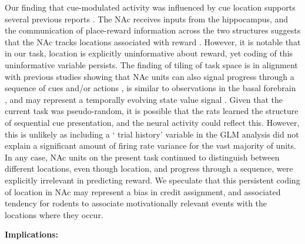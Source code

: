 \documentclass[11pt]{article}
\let\cite=\citep
\providecommand{\DIFadd}[1]{{\protect\color{red} \sf #1}} %
\providecommand{\DIFdel}[1]{} %
\providecommand{\DIFaddbegin}{} %
\providecommand{\DIFaddend}{} %
\providecommand{\DIFdelbegin}{} %
\providecommand{\DIFdelend}{} %
\newcommand{\DIFscaledelfig}{0.5}
\newlength{\DIFdelgraphicswidth} %
\newlength{\DIFdelgraphicsheight} %
\newcommand{\DIFaddincludegraphics}[2][]{{\color{red}\fbox{\DIFOincludegraphics[#1]{#2}}}} %
\newcommand{\DIFdelincludegraphics}[2][]{%
\sbox{\DIFdelgraphicsbox}{\DIFOincludegraphics[#1]{#2}}%
\settoboxwidth{\DIFdelgraphicswidth}{\DIFdelgraphicsbox} %
\settoboxtotalheight{\DIFdelgraphicsheight}{\DIFdelgraphicsbox} %
\scalebox{\DIFscaledelfig}{%
\parbox[b]{\DIFdelgraphicswidth}{\usebox{\DIFdelgraphicsbox}\\[-\baselineskip] \rule{\DIFdelgraphicswidth}{0em}}\llap{\resizebox{\DIFdelgraphicswidth}{\DIFdelgraphicsheight}{%
\setlength{\unitlength}{\DIFdelgraphicswidth}%
\begin{picture}(1,1)%
\thicklines\linethickness{2pt} %
{\color[rgb]{1,0,0}\put(0,0){\framebox(1,1){}}}%
{\color[rgb]{1,0,0}\put(0,0){\line( 1,1){1}}}%
{\color[rgb]{1,0,0}\put(0,1){\line(1,-1){1}}}%
\end{picture}%
}\hspace*{3pt}}} %
} %
\DeclareRobustCommand{\DIFaddbegin}{\DIFOaddbegin \let\includegraphics\DIFaddincludegraphics} %
\DeclareRobustCommand{\DIFaddend}{\DIFOaddend \let\includegraphics\DIFOincludegraphics} %
\DeclareRobustCommand{\DIFdelbegin}{\DIFOdelbegin \let\includegraphics\DIFdelincludegraphics} %
\DeclareRobustCommand{\DIFdelend}{\DIFOaddend \let\includegraphics\DIFOincludegraphics} %
\begin{document}
Our finding that \DIFdelbegin \DIFdel{cue-evoked activity was modulated }\DIFdelend \DIFaddbegin \DIFadd{cue-modulated activity was influenced }\DIFaddend by cue location \DIFdelbegin \DIFdel{is
in alignment with }\DIFdelend \DIFaddbegin \DIFadd{supports }\DIFaddend several previous reports \cite{Lavoie1994,Wiener2003,Mulder2005,Strait2016}. The NAc receives inputs from the hippocampus, and the communication of place-reward information across the two structures suggests that the NAc tracks locations associated with reward \cite{Tabuchi2000,Pennartz2004,Lansink2008,Lansink2009,VanderMeer2011,Lansink2016,Sjulson2017}. \DIFaddbegin \DIFadd{However, it is notable that in our task, location is explicitly uninformative about reward, yet coding of this uninformative variable persists. The finding of tiling of task space is in alignment with previous studies showing that }\DIFaddend NAc units can also signal progress through a sequence of cues and/or actions \cite{Shidara1998,Mulder2004,Khamassi2008,Berke2009,Lansink2012,Atallah2014}\DIFaddbegin \DIFadd{, is similar to observations in the basal forebrain \cite{Tingley2018}, and may represent a temporally evolving state value signal \cite{Pennartz2011,Hamid2016}}\DIFaddend . Given that the current task was pseudo-random, it is possible that the rats learned the structure of sequential cue presentation, and the neural activity could reflect this. However, this is unlikely as including a ‘\DIFdelbegin \DIFdel{previous trial }\DIFdelend \DIFaddbegin \DIFadd{trial history}\DIFaddend ’ variable in the \DIFaddbegin \DIFadd{GLM }\DIFaddend analysis did not explain a significant amount of firing rate variance \DIFdelbegin \DIFdel{in response to the cue }\DIFdelend for the vast majority of units. In any case, NAc units on the present task continued to distinguish between different locations, even though location, and progress through a sequence, were explicitly irrelevant in predicting reward. We speculate that this persistent coding of location in NAc may represent a bias in credit assignment, and associated tendency for rodents to associate motivationally relevant events with the locations where they occur.

{\bf Implications:}
\end{document}
